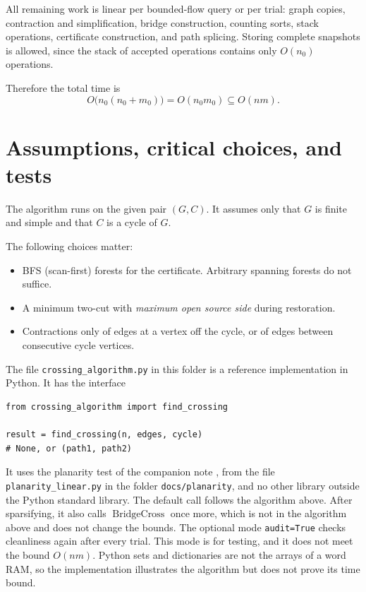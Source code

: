 \documentclass[11pt]{article}
\DeclareMathOperator{\BridgeCross}{BridgeCross}
\begin{document}
All remaining work is linear per bounded-flow query or per trial: graph
copies, contraction and simplification, bridge construction, counting sorts,
stack operations, certificate construction, and path splicing. Storing
complete snapshots is allowed, since the stack of accepted operations contains
only $O(n_0)$ operations.

Therefore the total time is
\begin{equation*}
O\bigl(n_0(n_0+m_0)\bigr)
=
O(n_0m_0)
\subseteq O(nm).
\end{equation*}

\section{Assumptions, critical choices, and tests}\label{sec:remarks}

The algorithm runs on the given pair $(G,C)$. It assumes only that $G$ is finite
and simple and that $C$ is a cycle of $G$.

The following choices matter:
\begin{itemize}[nosep]
\item BFS (scan-first) forests for the certificate. Arbitrary spanning forests
do not suffice.
\item A minimum two-cut with \emph{maximum open source side} during
restoration.
\item Contractions only of edges at a vertex off the cycle, or of edges between
consecutive cycle vertices.
\end{itemize}

The file \texttt{crossing\_algorithm.py} in this folder is a reference
implementation in Python. It has the interface
\begin{verbatim}
from crossing_algorithm import find_crossing

result = find_crossing(n, edges, cycle)
# None, or (path1, path2)
\end{verbatim}
It uses the planarity test of the companion note \cite{HJ26}, from the file
\texttt{planarity\_linear.py} in the folder \texttt{docs/planarity}, and no
other library outside the Python standard library. The default call follows
the algorithm above. After sparsifying, it also calls $\BridgeCross$ once more,
which is not in the algorithm above and does not change the bounds. The
optional mode \texttt{audit=True} checks cleanliness again after every trial.
This mode is for testing, and it does not meet the bound $O(nm)$. Python sets
and dictionaries are not the arrays of a word RAM, so the implementation
illustrates the algorithm but does not prove its time bound.
\end{document}
